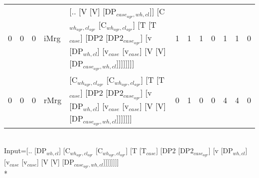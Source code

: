 \begin{tabularx}{\linewidth}{rrrlXrrrrrrr}
   0 &       0 &   0 & iMrg  & [.. [V [V] [DP$_{case_{agr},wh,cl}$]] [C$_{wh_{agr},cl_{agr}}$ [C$_{wh_{agr},cl_{agr}}$] [T [T$_{case}$] [DP2 [DP2$_{case_{agr}}$] [v [DP$_{wh,cl}$] [v$_{case}$ [v$_{case}$] [V [V] [DP$_{case_{agr},wh,cl}$]]]]]]]]                                                                    &             1 &             1 &                  1 &            0 &        1 &        1 &            0 \\
   0 &       0 &   0 & rMrg  & [C$_{wh_{agr},cl_{agr}}$ [C$_{wh_{agr},cl_{agr}}$] [T [T$_{case}$] [DP2 [DP2$_{case_{agr}}$] [v [DP$_{wh,cl}$] [v$_{case}$ [v$_{case}$] [V [V] [DP$_{case_{agr},wh,cl}$]]]]]]]                                                                                                     &             0 &             1 &                  0 &            0 &        4 &        4 &            0 \\
\hline
\end{tabularx}\endgroup\\
\begingroup\scriptsize Input=[.. [DP$_{wh,cl}$] [C$_{wh_{agr},cl_{agr}}$ [C$_{wh_{agr},cl_{agr}}$] [T [T$_{case}$] [DP2 [DP2$_{case_{agr}}$] [v [DP$_{wh,cl}$] [v$_{case}$ [v$_{case}$] [V [V] [DP$_{case_{agr},wh,cl}$]]]]]]]]\\*

